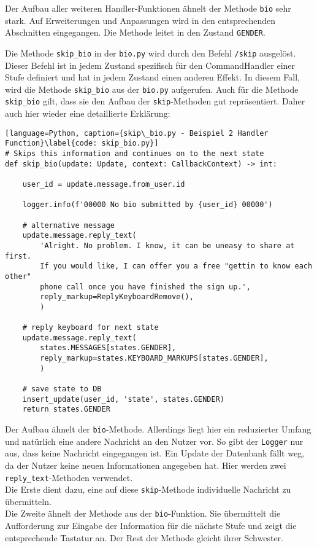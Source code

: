                 Der Aufbau aller weiteren Handler-Funktionen ähnelt der Methode \verb|bio| sehr stark. Auf Erweiterungen und Anpassungen wird in den entsprechenden Abschnitten eingegangen. Die Methode leitet in den Zustand \verb|GENDER|.

                Die Methode \verb|skip_bio| in der \verb|bio.py| wird durch den Befehl \verb|/skip| ausgelöst. Dieser Befehl ist in jedem Zustand spezifisch für den CommandHandler einer Stufe definiert und hat in jedem Zustand einen anderen Effekt. In diesem Fall, wird die Methode \verb|skip_bio| aus der \verb|bio.py| aufgerufen. Auch für die Methode \verb|skip_bio| gilt, dass sie den Aufbau der \verb|skip|-Methoden gut repräsentiert. Daher auch hier wieder eine detaillierte Erklärung:

                \begin{lstlisting}[language=Python, caption={skip\_bio.py - Beispiel 2 Handler Function}\label{code: skip_bio.py}]
# Skips this information and continues on to the next state
def skip_bio(update: Update, context: CallbackContext) -> int:
    
    user_id = update.message.from_user.id

    logger.info(f'00000 No bio submitted by {user_id} 00000')

    # alternative message
    update.message.reply_text(
        'Alright. No problem. I know, it can be uneasy to share at first. 
        If you would like, I can offer you a free "gettin to know each other" 
        phone call once you have finished the sign up.',
        reply_markup=ReplyKeyboardRemove(),
        )

    # reply keyboard for next state
    update.message.reply_text(
        states.MESSAGES[states.GENDER],
        reply_markup=states.KEYBOARD_MARKUPS[states.GENDER],
        )    

    # save state to DB
    insert_update(user_id, 'state', states.GENDER)
    return states.GENDER
                \end{lstlisting}


                Der Aufbau ähnelt der \verb|bio|-Methode. Allerdings liegt hier ein reduzierter Umfang und natürlich eine andere Nachricht an den Nutzer vor. So gibt der \verb|Logger| nur aus, dass keine Nachricht eingegangen ist. Ein Update der Datenbank fällt weg, da der Nutzer keine neuen Informationen angegeben hat. Hier werden zwei \verb|reply_text|-Methoden verwendet. \\
                Die Erste dient dazu, eine auf diese \verb|skip|-Methode individuelle Nachricht zu übermitteln. \\
                Die Zweite ähnelt der Methode aus der \verb|bio|-Funktion. Sie übermittelt die Aufforderung zur Eingabe der Information für die nächste Stufe und zeigt die entsprechende Tastatur an. Der Rest der Methode gleicht ihrer Schwester.


